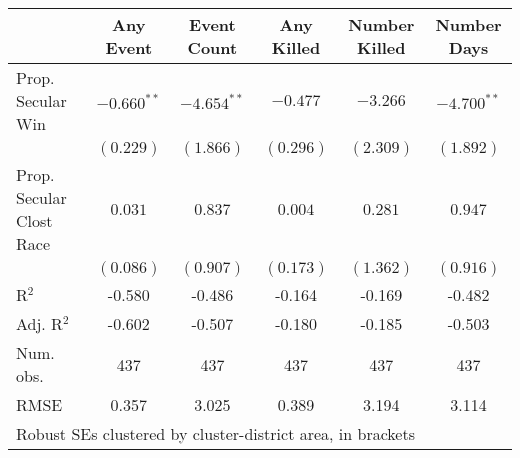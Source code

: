 
\begin{tabular}{l c c c c c }
\hline
 & Any Event & Event Count & Any Killed & Number Killed & Number Days \\
\hline
Prop. Secular Win        & $-0.660^{**}$ & $-4.654^{**}$ & $-0.477$  & $-3.266$  & $-4.700^{**}$ \\
                         & $(0.229)$     & $(1.866)$     & $(0.296)$ & $(2.309)$ & $(1.892)$     \\
Prop. Secular Clost Race & $0.031$       & $0.837$       & $0.004$   & $0.281$   & $0.947$       \\
                         & $(0.086)$     & $(0.907)$     & $(0.173)$ & $(1.362)$ & $(0.916)$     \\
\hline
R$^2$                    & -0.580        & -0.486        & -0.164    & -0.169    & -0.482        \\
Adj. R$^2$               & -0.602        & -0.507        & -0.180    & -0.185    & -0.503        \\
Num. obs.                & 437           & 437           & 437       & 437       & 437           \\
RMSE                     & 0.357         & 3.025         & 0.389     & 3.194     & 3.114         \\
\hline
\multicolumn{6}{l}{\scriptsize{Robust SEs clustered by cluster-district area, in brackets}}
\end{tabular}
